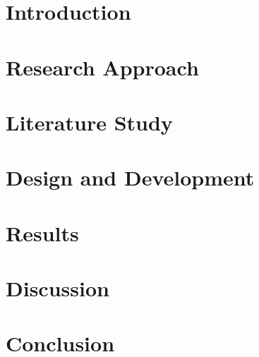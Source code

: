 \documentclass[12pt]{report}
\begin{document}
%
\setcounter{page}{0}


\tableofcontents
\newpage
\listoftables
\newpage
\listoffigures
\newpage
\setcounter{page}{0}
%
%
\part{Introduction}

\part{Research Approach}



\part{Literature Study}



\part{Design and Development}

\part{Results}

\part{Discussion}

\part{Conclusion}



\clearpage



\begin{appendices}
\end{appendices}
\end{document}
